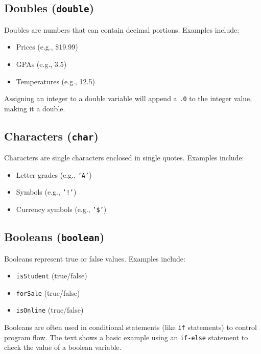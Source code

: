 \documentclass{article}
\begin{document}
\subsection{Doubles (\texttt{double})}

Doubles are numbers that can contain decimal portions. Examples include:

\begin{itemize}
    \item Prices (e.g., \$19.99)
    \item GPAs (e.g., 3.5)
    \item Temperatures (e.g., 12.5)
\end{itemize}

Assigning an integer to a double variable will append a \texttt{.0} to the integer value, making it a double.

\subsection{Characters (\texttt{char})}

Characters are single characters enclosed in single quotes.  Examples include:

\begin{itemize}
    \item Letter grades (e.g., \texttt{'A'})
    \item Symbols (e.g., \texttt{'!'})
    \item Currency symbols (e.g., \texttt{'\$'})
\end{itemize}

\subsection{Booleans (\texttt{boolean})}

Booleans represent true or false values. Examples include:

\begin{itemize}
    \item \texttt{isStudent} (true/false)
    \item \texttt{forSale} (true/false)
    \item \texttt{isOnline} (true/false)
\end{itemize}

Booleans are often used in conditional statements (like \texttt{if} statements) to control program flow.  The text shows a basic example using an \texttt{if-else} statement to check the value of a boolean variable.
\end{document}
